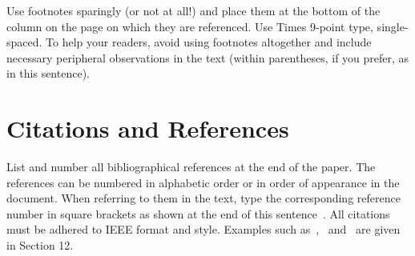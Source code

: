 \documentclass{article}
\begin{document}
Use footnotes sparingly (or not at all!) and place them at the bottom of the column on the page on which they are referenced. Use Times 9-point type, single-spaced. To help your readers, avoid using footnotes altogether and include necessary peripheral observations in the text (within parentheses, if you prefer, as in this sentence).

\section{Citations and References}

List and number all bibliographical references at the end of the paper. The references can be numbered in alphabetic order or in order of appearance in the document. When referring to them in the text, type the corresponding reference number in square brackets as shown at the end of this sentence~\cite{Morgan2005}. All citations must be adhered to IEEE format and style. Examples such as~\cite{Morgan2005},~\cite{cooley65} and~\cite{haykin02} are given in Section 12.



\end{document}
